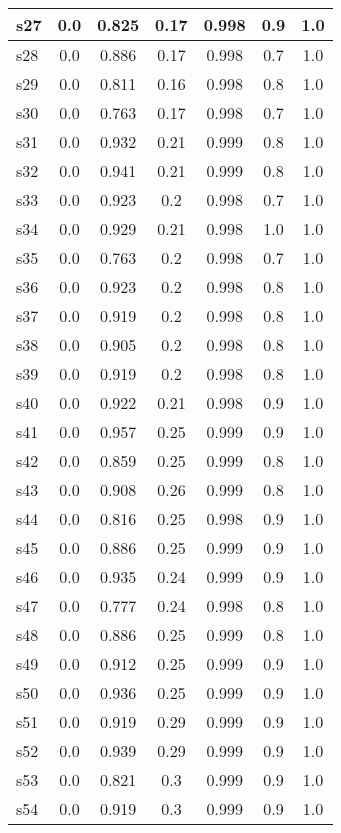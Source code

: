 \documentclass{article}
\begin{document}
\begin{tabular}{|l|c|c|c|c|c|c|}
\hline
s27 &0.0 & 0.825 & 0.17 & 0.998 & 0.9 & 1.0\\
\hline
s28 &0.0 & 0.886 & 0.17 & 0.998 & 0.7 & 1.0\\
\hline
s29 &0.0 & 0.811 & 0.16 & 0.998 & 0.8 & 1.0\\
\hline
s30 &0.0 & 0.763 & 0.17 & 0.998 & 0.7 & 1.0\\
\hline
s31 &0.0 & 0.932 & 0.21 & 0.999 & 0.8 & 1.0\\
\hline
s32 &0.0 & 0.941 & 0.21 & 0.999 & 0.8 & 1.0\\
\hline
s33 &0.0 & 0.923 & 0.2 & 0.998 & 0.7 & 1.0\\
\hline
s34 &0.0 & 0.929 & 0.21 & 0.998 & 1.0 & 1.0\\
\hline
s35 &0.0 & 0.763 & 0.2 & 0.998 & 0.7 & 1.0\\
\hline
s36 &0.0 & 0.923 & 0.2 & 0.998 & 0.8 & 1.0\\
\hline
s37 &0.0 & 0.919 & 0.2 & 0.998 & 0.8 & 1.0\\
\hline
s38 &0.0 & 0.905 & 0.2 & 0.998 & 0.8 & 1.0\\
\hline
s39 &0.0 & 0.919 & 0.2 & 0.998 & 0.8 & 1.0\\
\hline
s40 &0.0 & 0.922 & 0.21 & 0.998 & 0.9 & 1.0\\
\hline
s41 &0.0 & 0.957 & 0.25 & 0.999 & 0.9 & 1.0\\
\hline
s42 &0.0 & 0.859 & 0.25 & 0.999 & 0.8 & 1.0\\
\hline
s43 &0.0 & 0.908 & 0.26 & 0.999 & 0.8 & 1.0\\
\hline
s44 &0.0 & 0.816 & 0.25 & 0.998 & 0.9 & 1.0\\
\hline
s45 &0.0 & 0.886 & 0.25 & 0.999 & 0.9 & 1.0\\
\hline
s46 &0.0 & 0.935 & 0.24 & 0.999 & 0.9 & 1.0\\
\hline
s47 &0.0 & 0.777 & 0.24 & 0.998 & 0.8 & 1.0\\
\hline
s48 &0.0 & 0.886 & 0.25 & 0.999 & 0.8 & 1.0\\
\hline
s49 &0.0 & 0.912 & 0.25 & 0.999 & 0.9 & 1.0\\
\hline
s50 &0.0 & 0.936 & 0.25 & 0.999 & 0.9 & 1.0\\
\hline
s51 &0.0 & 0.919 & 0.29 & 0.999 & 0.9 & 1.0\\
\hline
s52 &0.0 & 0.939 & 0.29 & 0.999 & 0.9 & 1.0\\
\hline
s53 &0.0 & 0.821 & 0.3 & 0.999 & 0.9 & 1.0\\
\hline
s54 &0.0 & 0.919 & 0.3 & 0.999 & 0.9 & 1.0\\
\hline

\end{tabular}
\end{document}
